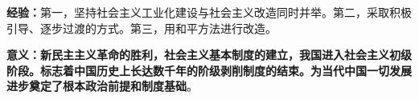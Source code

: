 \textbf{经验：}第一，坚持社会主义工业化建设与社会主义改造同时并举。第二，采取积极引导、逐步过渡的方式。第三，用和平方法进行改造。

\textbf{{意义}：新民主主义革命的胜利，社会主义基本制度的建立，我国进入社会主义初级阶段。标志着中国历史上长达数千年的阶级剥削制度的结束。为当代中国一切发展进步奠定了根本政治前提和制度基础}{。}
